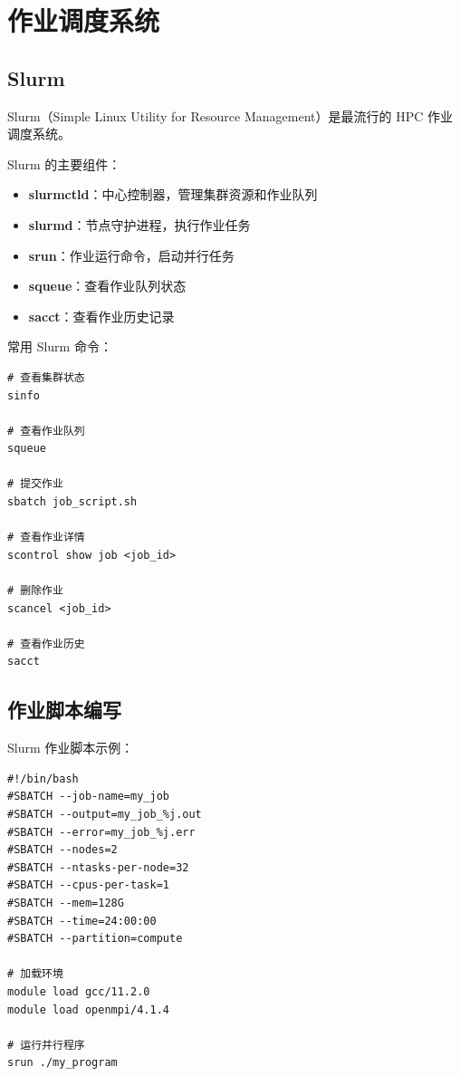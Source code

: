 \documentclass[12pt,UTF8]{ctexbook}
\begin{document}
\chapter{作业调度系统}
\label{chap:job_scheduling}

\section{Slurm}
\label{sec:slurm}

Slurm（Simple Linux Utility for Resource Management）是最流行的 HPC 作业调度系统。

Slurm 的主要组件：
\begin{itemize}
    \item \textbf{slurmctld}：中心控制器，管理集群资源和作业队列
    \item \textbf{slurmd}：节点守护进程，执行作业任务
    \item \textbf{srun}：作业运行命令，启动并行任务
    \item \textbf{squeue}：查看作业队列状态
    \item \textbf{sacct}：查看作业历史记录
\end{itemize}

常用 Slurm 命令：
\begin{verbatim}
# 查看集群状态
sinfo

# 查看作业队列
squeue

# 提交作业
sbatch job_script.sh

# 查看作业详情
scontrol show job <job_id>

# 删除作业
scancel <job_id>

# 查看作业历史
sacct
\end{verbatim}

\section{作业脚本编写}
\label{sec:job_script}

Slurm 作业脚本示例：
\begin{verbatim}
#!/bin/bash
#SBATCH --job-name=my_job
#SBATCH --output=my_job_%j.out
#SBATCH --error=my_job_%j.err
#SBATCH --nodes=2
#SBATCH --ntasks-per-node=32
#SBATCH --cpus-per-task=1
#SBATCH --mem=128G
#SBATCH --time=24:00:00
#SBATCH --partition=compute

# 加载环境
module load gcc/11.2.0
module load openmpi/4.1.4

# 运行并行程序
srun ./my_program
\end{verbatim}
\end{document}
